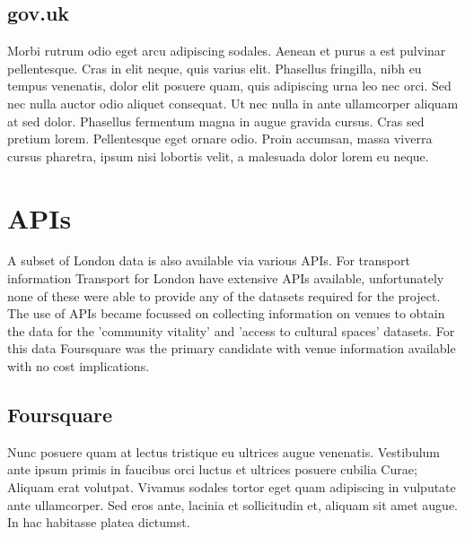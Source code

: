 
\subsection{gov.uk}
Morbi rutrum odio eget arcu adipiscing sodales. Aenean et purus a est pulvinar pellentesque. Cras in elit neque, quis varius elit. Phasellus fringilla, nibh eu tempus venenatis, dolor elit posuere quam, quis adipiscing urna leo nec orci. Sed nec nulla auctor odio aliquet consequat. Ut nec nulla in ante ullamcorper aliquam at sed dolor. Phasellus fermentum magna in augue gravida cursus. Cras sed pretium lorem. Pellentesque eget ornare odio. Proin accumsan, massa viverra cursus pharetra, ipsum nisi lobortis velit, a malesuada dolor lorem eu neque.


\section{APIs}

A subset of London data is also available via various APIs. For transport information Transport for London have extensive APIs available, unfortunately none of these were able to provide any of the datasets required for the project. The use of APIs became focussed on collecting information on venues to obtain the data for the 'community vitality' and 'access to cultural spaces' datasets. For this data Foursquare was the primary candidate with venue information available with no cost implications. 

\subsection{Foursquare}

Nunc posuere quam at lectus tristique eu ultrices augue venenatis. Vestibulum ante ipsum primis in faucibus orci luctus et ultrices posuere cubilia Curae; Aliquam erat volutpat. Vivamus sodales tortor eget quam adipiscing in vulputate ante ullamcorper. Sed eros ante, lacinia et sollicitudin et, aliquam sit amet augue. In hac habitasse platea dictumst.

